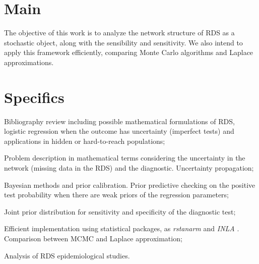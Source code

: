 \section{Main}

The objective of this work is to analyze the network structure of RDS as a
stochastic object, along with the sensibility and sensitivity. We also intend
to apply this framework efficiently, comparing Monte Carlo algorithms and
Laplace approximations.



\section{Specifics}

\begin{alineas}
    \item Bibliography review including possible mathematical formulations of
    RDS, logistic regression when the outcome has uncertainty (imperfect
    tests) and applications in hidden or hard-to-reach populations; 

    \item Problem description in mathematical terms considering the
    uncertainty in the network (missing data in the RDS) and the
    diagnostic. Uncertainty propagation; 

    \item Bayesian methods and prior calibration. Prior predictive checking on
    the positive test probability when there are weak priors of the
    regression parameters; 

    \item Joint prior distribution for sensitivity and specificity of the
    diagnostic test;

    \item Efficient implementation using statistical packages, as {\em
    rstanarm} \cite{rstanarm} and {\em INLA} \cite{rue2009approximate}. Comparison between MCMC and Laplace
    approximation; 

    \item Analysis of RDS epidemiological studies.
\end{alineas}